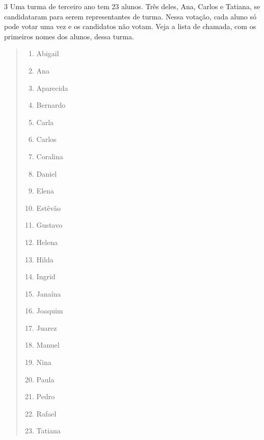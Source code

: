 \num{3} Uma turma de terceiro ano tem 23 alunos. Três deles, Ana, Carlos e Tatiana, se candidataram para serem representantes de turma. Nessa votação, cada aluno só pode votar uma vez e os candidatos não votam. Veja a lista de chamada, com os primeiros nomes dos alunos, dessa turma.

\begin{quote}
\begin{multicols}{2}
\begin{enumerate}
\item Abigail

\item Ana

\item Aparecida

\item Bernardo

\item Carla

\item Carlos

\item Coralina

\item Daniel 

\item Elena

\item Estêvão

\item Gustavo

\item Helena

\item Hilda

\item Ingrid

\item Janaína

\item Joaquim

\item Juarez

\item Manuel

\item Nina

\item Paula

\item Pedro

\item Rafael

\item Tatiana
\end{enumerate}
\end{multicols}
\end{quote}

